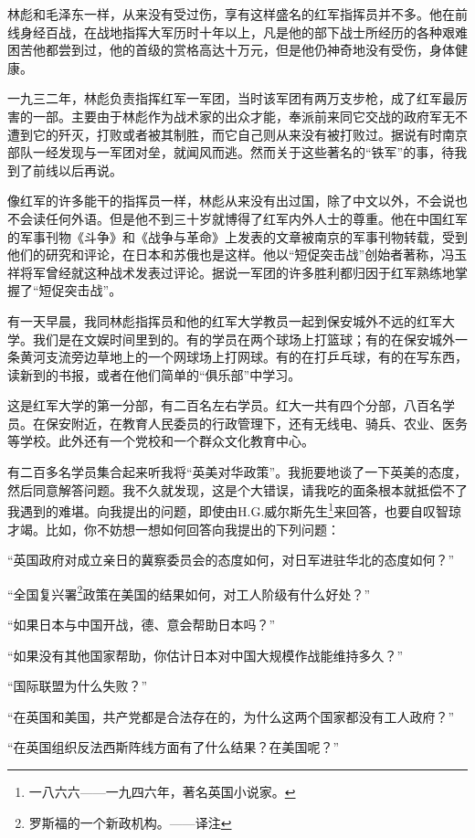 \documentclass[10pt]{book}
\begin{document}
林彪和毛泽东一样，从来没有受过伤，享有这样盛名的红军指挥员并不多。他在前线身经百战，在战地指挥大军历时十年以上，凡是他的部下战士所经历的各种艰难困苦他都尝到过，他的首级的赏格高达十万元，但是他仍神奇地没有受伤，身体健康。

一九三二年，林彪负责指挥红军一军团，当时该军团有两万支步枪，成了红军最厉害的一部。主要由于林彪作为战术家的出众才能，奉派前来同它交战的政府军无不遭到它的歼灭，打败或者被其制胜，而它自己则从来没有被打败过。据说有时南京部队一经发现与一军团对垒，就闻风而逃。然而关于这些著名的“铁军”的事，待我到了前线以后再说。

像红军的许多能干的指挥员一样，林彪从来没有出过国，除了中文以外，不会说也不会读任何外语。但是他不到三十岁就博得了红军内外人士的尊重。他在中国红军的军事刊物《斗争》和《战争与革命》上发表的文章被南京的军事刊物转载，受到他们的研究和评论，在日本和苏俄也是这样。他以“短促突击战”创始者著称，冯玉祥将军曾经就这种战术发表过评论。据说一军团的许多胜利都归因于红军熟练地掌握了“短促突击战”。

有一天早晨，我同林彪指挥员和他的红军大学教员一起到保安城外不远的红军大学。我们是在文娱时间里到的。有的学员在两个球场上打篮球；有的在保安城外一条黄河支流旁边草地上的一个网球场上打网球。有的在打乒乓球，有的在写东西，读新到的书报，或者在他们简单的“俱乐部”中学习。

这是红军大学的第一分部，有二百名左右学员。红大一共有四个分部，八百名学员。在保安附近，在教育人民委员的行政管理下，还有无线电、骑兵、农业、医务等学校。此外还有一个党校和一个群众文化教育中心。

有二百多名学员集合起来听我将“英美对华政策”。我扼要地谈了一下英美的态度，然后同意解答问题。我不久就发现，这是个大错误，请我吃的面条根本就抵偿不了我遇到的难堪。向我提出的问题，即使由H.G.威尔斯先生\footnote{一八六六——一九四六年，著名英国小说家。}来回答，也要自叹智琼才竭。比如，你不妨想一想如何回答向我提出的下列问题：

“英国政府对成立亲日的冀察委员会的态度如何，对日军进驻华北的态度如何？”

“全国复兴署\footnote{罗斯福的一个新政机构。——译注}政策在美国的结果如何，对工人阶级有什么好处？”

“如果日本与中国开战，德、意会帮助日本吗？”

“如果没有其他国家帮助，你估计日本对中国大规模作战能维持多久？”

“国际联盟为什么失败？”

“在英国和美国，共产党都是合法存在的，为什么这两个国家都没有工人政府？”

“在英国组织反法西斯阵线方面有了什么结果？在美国呢？”
\end{document}
